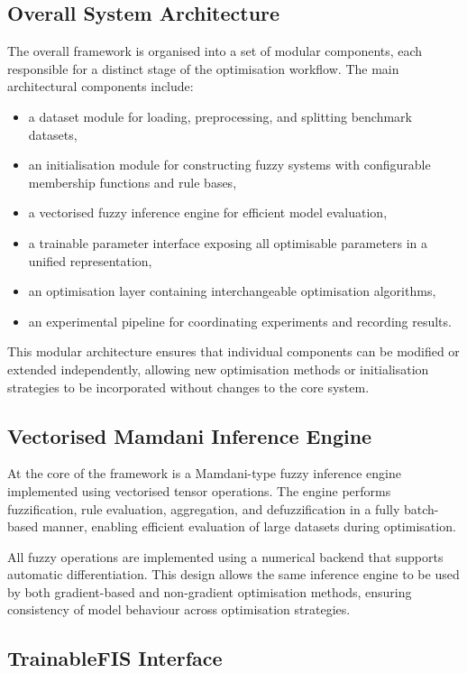 \documentclass[a4paper,12pt,oneside]{article}
\begin{document}
\subsection{Overall System Architecture}

The overall framework is organised into a set of modular components, each responsible for a distinct stage of the optimisation workflow. The main architectural components include:
\begin{itemize}
    \item a dataset module for loading, preprocessing, and splitting benchmark datasets,
    \item an initialisation module for constructing fuzzy systems with configurable membership functions and rule bases,
    \item a vectorised fuzzy inference engine for efficient model evaluation,
    \item a trainable parameter interface exposing all optimisable parameters in a unified representation,
    \item an optimisation layer containing interchangeable optimisation algorithms,
    \item an experimental pipeline for coordinating experiments and recording results.
\end{itemize}

This modular architecture ensures that individual components can be modified or extended independently, allowing new optimisation methods or initialisation strategies to be incorporated without changes to the core system.

\subsection{Vectorised Mamdani Inference Engine}

At the core of the framework is a Mamdani-type fuzzy inference engine implemented using vectorised tensor operations. The engine performs fuzzification, rule evaluation, aggregation, and defuzzification in a fully batch-based manner, enabling efficient evaluation of large datasets during optimisation.

All fuzzy operations are implemented using a numerical backend that supports automatic differentiation. This design allows the same inference engine to be used by both gradient-based and non-gradient optimisation methods, ensuring consistency of model behaviour across optimisation strategies.

\subsection{TrainableFIS Interface}
\end{document}
